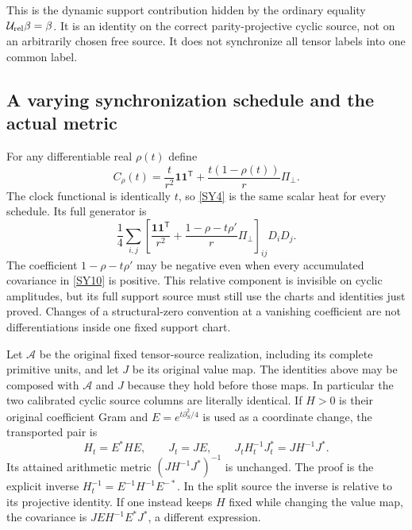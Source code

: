 \documentclass[11pt,a4paper]{article}
\theoremstyle{definition}\newtheorem{definition}[theorem]{Definition}
\newcommand{\ve}{\mathbf 1}\newcommand{\sh}{\sharp}
\begin{document}
This is the dynamic support contribution hidden by the ordinary equality $\mathcal U_{\rm rel}\beta=\beta$. It is an identity on the correct parity-projective cyclic source, not on an arbitrarily chosen free source. It does not synchronize all tensor labels into one common label.

\subsection{A varying synchronization schedule and the actual metric}
For any differentiable real $\rho(t)$ define
\begin{equation}
 C_\rho(t)=\frac{t}{r^2}\ve\ve^{\mathsf T}
             +\frac{t(1-\rho(t))}{r}\Pi_\perp.
                                                               \tag{SY10}\label{SY10}
\end{equation}
The clock functional is identically $t$, so \eqref{SY4} is the same scalar heat for every schedule. Its full generator is
\begin{equation}
 \frac14\sum_{i,j}
 \left[\frac{\ve\ve^{\mathsf T}}{r^2}
 +\frac{1-\rho-t\rho'}r\Pi_\perp\right]_{ij}D_iD_j.
                                                               \tag{SY11}\label{SY11}
\end{equation}
The coefficient $1-\rho-t\rho'$ may be negative even when every accumulated covariance in \eqref{SY10} is positive. This relative component is invisible on cyclic amplitudes, but its full support source must still use the charts and identities just proved. Changes of a structural-zero convention at a vanishing coefficient are not differentiations inside one fixed support chart.

Let $\mathcal A$ be the original fixed tensor-source realization, including its complete primitive units, and let $J$ be its original value map. The identities above may be composed with $\mathcal A$ and $J$ because they hold before those maps. In particular the two calibrated cyclic source columns are literally identical. If $H>0$ is their original coefficient Gram and $E=e^{t\partial_S^2/4}$ is used as a coordinate change, the transported pair is
\begin{equation}
 H_t=E^*HE,\qquad J_t=JE,
 \qquad J_tH_t^{-1}J_t^*=JH^{-1}J^*.                          \tag{SY12}\label{SY12}
\end{equation}
Its attained arithmetic metric $(JH^{-1}J^*)^{-1}$ is unchanged. The proof is the explicit inverse $H_t^{-1}=E^{-1}H^{-1}E^{-*}$. In the split source the inverse is relative to its projective identity. If one instead keeps $H$ fixed while changing the value map, the covariance is $JEH^{-1}E^*J^*$, a different expression.
\end{document}
